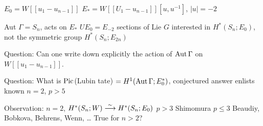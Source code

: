 $E_0= W[[u_1-u_{n-1}]]$
$E_*= W[[U_1-u_{n-1}]][u,u^{-1}]$, $|u|= -2$

Aut $\Gamma= S_n$, acts on $E_*$
$UE_0= E_{-2}$ sections of Lie $G$
interested in $H^*(S_n; E_0)$, not the symmetric group
$H^*(S_n; E_{2n})$


Question: Can one write down explicitly the action of $\operatorname{Aut} \Gamma$ on $W[[u_1-u_{n-1}]]$.

Question: What is $\operatorname{Pic}$(Lubin tate) $=H^1(\operatorname{Aut} \Gamma; E_0^*)$, conjectured answer enlists known $n=2$, $p>5$


Observation: $n=2$, $H^*(S_n; W) \stackrel{\sim}{\longrightarrow} H^*(S_n;E_0)$
$p>3$ Shimomura
$p \leq 3$ Beaudiy, Bobkova, Behrens, Wenn, \dots
True for $n>2$?















